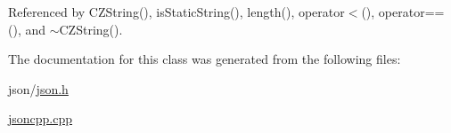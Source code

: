 Referenced by C\+Z\+String(), is\+Static\+String(), length(), operator$<$(), operator==(), and $\sim$\+C\+Z\+String().



The documentation for this class was generated from the following files\+:\begin{DoxyCompactItemize}
\item 
json/\hyperlink{json_8h}{json.\+h}\item 
\hyperlink{jsoncpp_8cpp}{jsoncpp.\+cpp}\end{DoxyCompactItemize}
